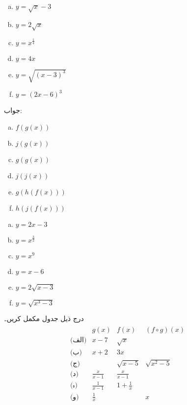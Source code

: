 \begin{multicols}{4}
\begin{enumerate}[a.]
\item
$y=\sqrt{x}-3$
\item
$y=2\sqrt{x}$
\item
$y=x^{\tfrac{1}{4}}$
\item
$y=4x$
\item
$y=\sqrt{(x-3)^3}$
\item
$y=(2x-6)^3$
\end{enumerate}
\end{multicols}
جواب:
\begin{multicols}{4}
\begin{enumerate}[a.]
\item
$f(g(x))$
\item
$j(g(x))$
\item
$g(g(x))$
\item
$j(j(x))$
\item
$g(h(f(x)))$
\item
$h(j(f(x)))$
\end{enumerate}
\end{multicols}
\begin{multicols}{4}
\begin{enumerate}[a.]
\item
$y=2x-3$
\item
$y=x^{\tfrac{3}{2}}$
\item
$y=x^9$
\item
$y=x-6$
\item
$y=2\sqrt{x-3}$
\item
$y=\sqrt{x^3-3}$
\end{enumerate}
\end{multicols}
درج ذیل جدول مکمل کریں۔
\begin{align*}
\begin{array}{cccc}
&g(x)&f(x)&(f\circ g)(x)\\
\hline
\text{(الف)} & x-7& \sqrt{x}&\\
\text{(ب)}&x+2&3x&\\
\text{(ج)} & &\sqrt{x-5}&\sqrt{x^2-5}\\
\text{(د)} &\frac{x}{x-1}&\frac{x}{x-1}&\\
\text{(ہ)}& \frac{1}{x-1}&1+\frac{1}{x}&\\
\text{(و)} &\frac{1}{x}&&x
\end{array}
\end{align*}
